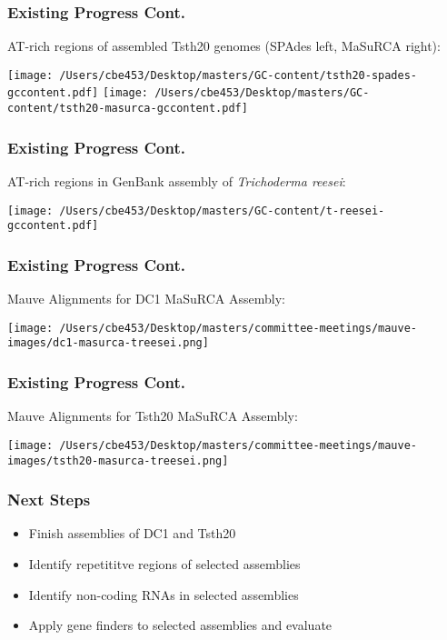 \documentclass{beamer}
\begin{document}
\begin{frame}
  \frametitle{Existing Progress Cont.}
  AT-rich regions of assembled Tsth20 genomes (SPAdes left, MaSuRCA right):
  \begin{center}
    \texttt{[image: /Users/cbe453/Desktop/masters/GC-content/tsth20-spades-gccontent.pdf]}
    \texttt{[image: /Users/cbe453/Desktop/masters/GC-content/tsth20-masurca-gccontent.pdf]}
  \end{center}
\end{frame}

\begin{frame}
  \frametitle{Existing Progress Cont.}
  AT-rich regions in GenBank assembly of \textit{Trichoderma reesei}:
  \begin{center}
    \texttt{[image: /Users/cbe453/Desktop/masters/GC-content/t-reesei-gccontent.pdf]}
  \end{center}
\end{frame}

\begin{frame}
  \frametitle{Existing Progress Cont.}
  Mauve Alignments for DC1 MaSuRCA Assembly:
  \begin{center}
    \texttt{[image: /Users/cbe453/Desktop/masters/committee-meetings/mauve-images/dc1-masurca-treesei.png]}
  \end{center}
\end{frame}

\begin{frame}
  \frametitle{Existing Progress Cont.}
  Mauve Alignments for Tsth20 MaSuRCA Assembly:
  \begin{center}
    \texttt{[image: /Users/cbe453/Desktop/masters/committee-meetings/mauve-images/tsth20-masurca-treesei.png]}
  \end{center}
\end{frame}

\begin{frame}
  \frametitle{Next Steps}
  \begin{itemize}
  \item Finish assemblies of DC1 and Tsth20
  \item Identify repetititve regions of selected assemblies
  \item Identify non-coding RNAs in selected assemblies
  \item Apply gene finders to selected assemblies and evaluate
  \end{itemize}
\end{frame}
\end{document}
